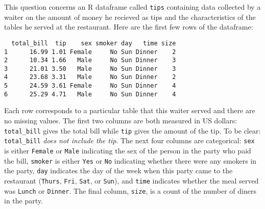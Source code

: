\documentclass[addpoints,12pt]{exam}
\begin{document}
\begin{questions}
  \question This question concerns an R dataframe called \texttt{tips} containing data collected by a waiter on the amount of money he recieved as tips and the characteristics of the tables he served at the restaurant. 
  Here are the first few rows of the dataframe:
  \begin{verbatim}
  total_bill  tip    sex smoker day   time size
1      16.99 1.01 Female     No Sun Dinner    2
2      10.34 1.66   Male     No Sun Dinner    3
3      21.01 3.50   Male     No Sun Dinner    3
4      23.68 3.31   Male     No Sun Dinner    2
5      24.59 3.61 Female     No Sun Dinner    4
6      25.29 4.71   Male     No Sun Dinner    4
  \end{verbatim}
  Each row corresponds to a particular table that this waiter served and there are no missing values.
  The first two columns are both measured in US dollars: \texttt{total\_bill} gives the total bill while \texttt{tip} gives the amount of the tip.
  To be clear: \texttt{total\_bill} \emph{does not include the tip}.
  The next four columns are categorical: \texttt{sex} is either \texttt{Female} or \texttt{Male} indicating the sex of the person in the party who paid the bill, \texttt{smoker} is either \texttt{Yes} or \texttt{No} indicating whether there were any smokers in the party, \texttt{day} indicates the day of the week when this party came to the restaurant (\texttt{Thurs}, \texttt{Fri}, \texttt{Sat}, or \texttt{Sun}), and \texttt{time} indicates whether the meal served was \texttt{Lunch} or \texttt{Dinner}.
  The final column, \texttt{size}, is a count of the number of diners in the party.
\end{questions}
\end{document}
